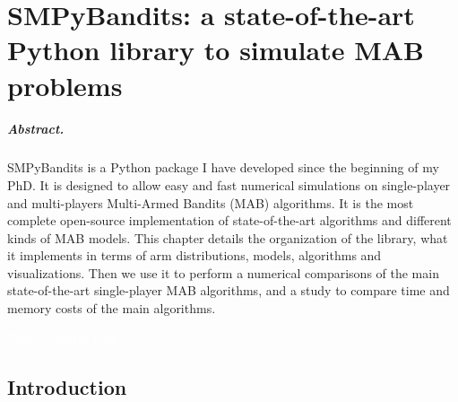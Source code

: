 
\chapter{SMPyBandits: a state-of-the-art Python library to simulate MAB problems}
\label{chapter:3}

\graphicspath{{2-Chapters/3-Chapter/Images/}}
\graphicspath{{2-Chapters/3-Chapter/SMPyBandits_paper.git/plots/}}

\paragraph{Abstract.}
%
SMPyBandits is a Python package I have developed since the beginning of my PhD.
It is designed to allow easy and fast numerical simulations on single-player and multi-players Multi-Armed Bandits (MAB) algorithms.
It is the most complete open-source implementation of state-of-the-art algorithms and different kinds of MAB models.
%
This chapter details the organization of the library, what it implements in terms of arm distributions, models, algorithms and visualizations.
Then we use it to perform a numerical comparisons of the main state-of-the-art single-player MAB algorithms, and a study to compare time and memory costs of the main algorithms.

\begin{center}
    \textcolor{white}{This is a durty hack?}
\end{center}

\minitoc

\newpage


\section{Introduction}
\label{sec:3:Introduction}




